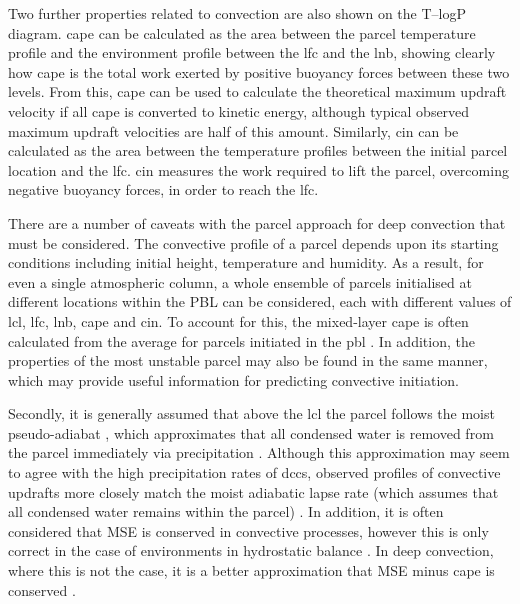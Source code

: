 Two further properties related to convection are also shown on the T--logP diagram. 
\acrshort{cape} can be calculated as the area between the parcel temperature profile and the environment profile between the \acrshort{lfc} and the \acrshort{lnb}, showing clearly how \acrshort{cape} is the total work exerted by positive buoyancy forces between these two levels. 
From this, \acrshort{cape} can be used to calculate the theoretical maximum updraft velocity if all \acrshort{cape} is converted to kinetic energy, although typical observed maximum updraft velocities are half of this amount. 
Similarly, \acrfull{cin} can be calculated as the area between the temperature profiles between the initial parcel location and the \acrshort{lfc}. 
\acrshort{cin} measures the work required to lift the parcel, overcoming negative buoyancy forces, in order to reach the \acrshort{lfc}.

There are a number of caveats with the parcel approach for deep convection that must be considered. 
The convective profile of a parcel depends upon its starting conditions including initial height, temperature and humidity. 
As a result, for even a single atmospheric column, a whole ensemble of parcels initialised at different locations within the PBL can be considered, each with different values of \acrshort{lcl}, \acrshort{lfc}, \acrshort{lnb}, \acrshort{cape} and \acrshort{cin}. 
To account for this, the mixed-layer \acrshort{cape} is often calculated from the average for parcels initiated in the \acrshort{pbl} \citep{stull_practical_2016}. 
In addition, the properties of the most unstable parcel may also be found in the same manner, which may provide useful information for predicting convective initiation.

Secondly, it is generally assumed that above the \acrshort{lcl} the parcel follows the moist pseudo-adiabat \citep{peters_generalized_2022}, which approximates that all condensed water is removed from the parcel immediately via precipitation \citep{emanuel_atmospheric_1994}. 
Although this approximation may seem to agree with the high precipitation rates of \acrshort{dcc}s, observed profiles of convective updrafts more closely match the moist adiabatic lapse rate (which assumes that all condensed water remains within the parcel) \citep{xu_is_1989}. 
In addition, it is often considered that MSE is conserved in convective processes, however this is only correct in the case of environments in hydrostatic balance \citep{peters_evaluating_2021}. 
In deep convection, where this is not the case, it is a better approximation that MSE minus \acrshort{cape} is conserved \citep{romps_mse_2015}.

